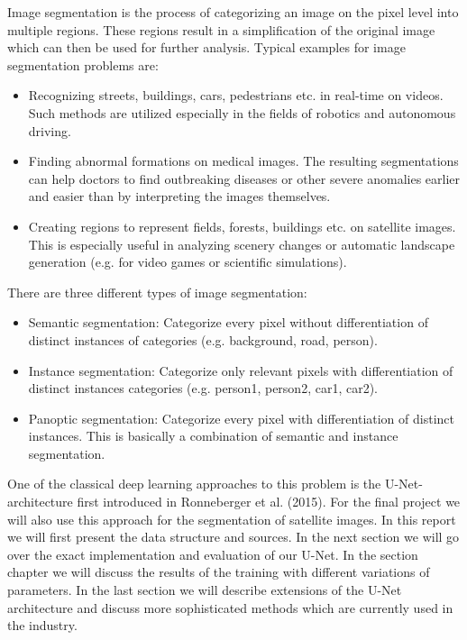 \documentclass[12pt]{article}
\begin{document}
Image segmentation is the process of categorizing an image on the pixel level into multiple regions. These regions result in a simplification of the original image which can then be used for further analysis. Typical examples for image segmentation problems are:
\begin{itemize}
	\item Recognizing streets, buildings, cars, pedestrians etc. in real-time on videos. Such methods are utilized especially in the fields of robotics and autonomous driving.
	\item Finding abnormal formations on medical images. The resulting segmentations can help doctors to find outbreaking diseases or other severe anomalies earlier and easier than by interpreting the images themselves.
	\item Creating regions to represent fields, forests, buildings etc. on satellite images. This is especially useful in analyzing scenery changes or automatic landscape generation (e.g. for video games or scientific simulations).
\end{itemize}
There are three different types of image segmentation:
\begin{itemize}
	\item Semantic segmentation: Categorize every pixel without differentiation of distinct instances of categories (e.g. background, road, person).
	\item Instance segmentation: Categorize only relevant pixels with differentiation of distinct instances categories (e.g. person1, person2, car1, car2).
	\item Panoptic segmentation: Categorize every pixel with differentiation of distinct instances. This is basically a combination of semantic and instance segmentation.
\end{itemize}
One of the classical deep learning approaches to this problem is the U-Net-architecture first introduced in Ronneberger et al. (2015). For the final project we will also use this approach for the segmentation of satellite images. \newline
In this report we will first present the data structure and sources. In the next section we will go over the exact implementation and evaluation of our U-Net. In the section chapter we will discuss the results of the training with different variations of parameters. In the last section we will describe extensions of the U-Net architecture and discuss more sophisticated methods which are currently used in the industry.
\newpage
\end{document}
